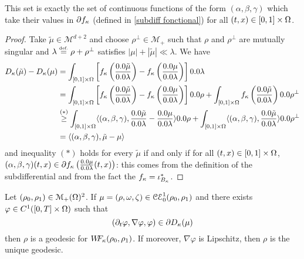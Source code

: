 \begin{remark}
This set is exactly the set of continuous functions of the form $(\alpha, \beta,\gamma)$ which take their values in $\partial f_{\kappa}$ (defined in \eqref{subdiff fonctional}) for all $(t,x)\in [0,1] \times \Omega$. %
\end{remark}

\begin{proof}
Take $\tilde{\mu}\in \mathcal{M}^{d+2}$ and choose $\rho^{\perp}\in \mathcal{M}_+$ such that $\rho$ and $\rho^{\perp}$ are mutually singular and $\lambda \stackrel{\mbox{\upshape\tiny def.}}{=} \rho + \rho^{\perp}$ satisfies $|\mu| + |\tilde{\mu}| \ll \lambda$. We have
\begin{align*}
\ifonc(\tilde{\mu})- \ifonc(\mu) 
&= \int_{[0,1] \times \Om} \left[\fonc \left( \frac{\d\tilde{\mu}}{\d\lambda} \right) - \fonc \left( \frac{\d\mu}{\d\lambda} \right) \right] \d\lambda \\
&= \int_{[0,1] \times \Om} \left[\fonc \left( \frac{\d\tilde{\mu}}{\d\lambda} \right) - \fonc \left( \frac{\d\mu}{\d\lambda} \right) \right] \d\rho + \int_{[0,1] \times \Om} \fonc \left( \frac{\d\tilde{\mu}}{\d\lambda} \right) \d\rho^{\perp} \\
& \overset{(*)}{\geq}  \int_{[0,1] \times \Om} \langle (\alpha,\beta,\gamma),  \frac{\d\tilde{\mu}}{\d\lambda}- \frac{\d\mu}{\d\lambda} \rangle  \d\rho+  \int_{[0,1] \times \Om} \langle (\alpha,\beta,\gamma) ,  \frac{\d\tilde{\mu}}{\d\lambda} \rangle \d\rho^{\perp}   \\
&= \langle (\alpha,\beta,\gamma), \tilde{\mu} - \mu \rangle
\end{align*}
and inequality $(*)$ holds for every $\tilde{\mu}$ if and only if for all $(t,x)\in [0,1] \times \Omega$, $(\alpha,\beta,\gamma)(t,x) \in \D \fonc \left(\frac{\d\mu}{\d\lambda}(t,x)\right)$: this comes from the definition of the subdifferential and from the fact the $f_{\kappa} = \iota_{B_{\kappa}}^*$.
\end{proof}

\begin{theorem}
Let $(\rho_0,\rho_1)\in \mathcal{M}_+(\Omega)^2$. If $\mu=(\rho,\omega,\zeta) \in \mathcal{CE}_0^1(\rho_0,\rho_1)$ and there exists $\varphi \in C^1([0,T] \times \Omega)$ such that
\[
(\partial_t \varphi, \nabla \varphi, \varphi) \in \partial D_{\kappa} (\mu)  
\]
then $\rho$ is a geodesic for $W\! \! F_{\kappa}(\rho_0,\rho_1)$. 
If moreover, $\nabla \varphi$ is Lipschitz, then $\rho$ is the unique geodesic.
\end{theorem}

